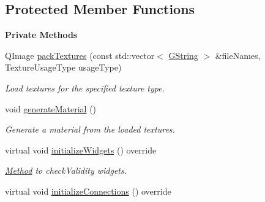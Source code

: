 \subsection*{Protected Member Functions}
\begin{Indent}\textbf{ Private Methods}\par
\begin{DoxyCompactItemize}
\item 
\mbox{\label{classrev_1_1_view_1_1_sprite_sheet_widget_a8e1f98e6c6aabd38f1568413081c276f}} 
Q\+Image \mbox{\hyperlink{classrev_1_1_view_1_1_sprite_sheet_widget_a8e1f98e6c6aabd38f1568413081c276f}{pack\+Textures}} (const std\+::vector$<$ \mbox{\hyperlink{classrev_1_1_g_string}{G\+String}} $>$ \&file\+Names, Texture\+Usage\+Type usage\+Type)
\begin{DoxyCompactList}\small\item\em Load textures for the specified texture type. \end{DoxyCompactList}\item 
\mbox{\label{classrev_1_1_view_1_1_sprite_sheet_widget_a519aa3bd9da1bec3411591b16b7633dd}} 
void \mbox{\hyperlink{classrev_1_1_view_1_1_sprite_sheet_widget_a519aa3bd9da1bec3411591b16b7633dd}{generate\+Material}} ()
\begin{DoxyCompactList}\small\item\em Generate a material from the loaded textures. \end{DoxyCompactList}\item 
\mbox{\label{classrev_1_1_view_1_1_sprite_sheet_widget_a7290c68fd794be0f8ed9fe858208aac1}} 
virtual void \mbox{\hyperlink{classrev_1_1_view_1_1_sprite_sheet_widget_a7290c68fd794be0f8ed9fe858208aac1}{initialize\+Widgets}} () override
\begin{DoxyCompactList}\small\item\em \mbox{\hyperlink{struct_method}{Method}} to check\+Validity widgets. \end{DoxyCompactList}\item 
\mbox{\label{classrev_1_1_view_1_1_sprite_sheet_widget_acea486571bd01a9ba6110b5061f6ebb7}} 
virtual void \mbox{\hyperlink{classrev_1_1_view_1_1_sprite_sheet_widget_acea486571bd01a9ba6110b5061f6ebb7}{initialize\+Connections}} () override

\end{DoxyCompactItemize}
\end{Indent}
